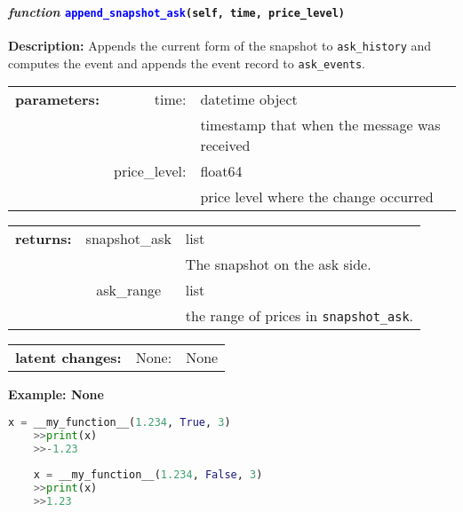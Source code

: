 \paragraph{\textit{function} \textcolor{blue}{\texttt{append\_snapshot\_ask}}\texttt{(self, time, price\_level)}}\hfill\break
\noindent \textbf{Description:} Appends the current form of the snapshot to \texttt{ask\_history} and computes the event and appends the event record to \texttt{ask\_events}. 

\begin{tabular}{r r l }
	\textbf{parameters:}	& time: & datetime object\\
	&  & timestamp that when the message was received\\
	& price\_level:& float64\\
	&& price level where the change occurred\\
\end{tabular}

\begin{tabular}{l c l}
	\textbf{returns:} & snapshot\_ask & list\\
	& & The snapshot on the ask side.\\
	& ask\_range & list\\
	&& the range of prices in \texttt{snapshot\_ask}.
\end{tabular}

\begin{tabular}{l c l}
	\textbf{latent changes:} & None: & None\\
\end{tabular}

\textbf{Example: None}
\begin{lstlisting}[language=Python]
	x = __my_function__(1.234, True, 3)
	>>print(x)
	>>-1.23
	
	x = __my_function__(1.234, False, 3)
	>>print(x)
	>>1.23
\end{lstlisting}
